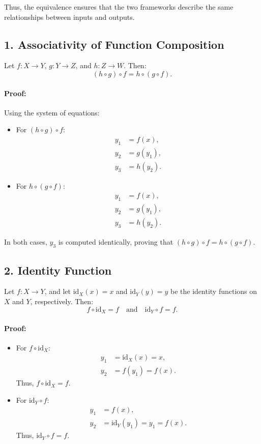 \documentclass{article}
\begin{document}
Thus, the equivalence ensures that the two frameworks describe the same relationships between inputs and outputs.

\subsection*{1. Associativity of Function Composition}
Let \( f: X \to Y \), \( g: Y \to Z \), and \( h: Z \to W \). Then:
\[
(h \circ g) \circ f = h \circ (g \circ f).
\]

\paragraph{Proof:} Using the system of equations:
\begin{itemize}
    \item For \( (h \circ g) \circ f \):
    \[
    \begin{aligned}
    y_1 &= f(x), \\
    y_2 &= g(y_1), \\
    y_3 &= h(y_2).
    \end{aligned}
    \]
    \item For \( h \circ (g \circ f) \):
    \[
    \begin{aligned}
    y_1 &= f(x), \\
    y_2 &= g(y_1), \\
    y_3 &= h(y_2).
    \end{aligned}
    \]
\end{itemize}
In both cases, \( y_3 \) is computed identically, proving that \( (h \circ g) \circ f = h \circ (g \circ f) \).

\subsection*{2. Identity Function}
Let \( f: X \to Y \), and let \( \text{id}_X(x) = x \) and \( \text{id}_Y(y) = y \) be the identity functions on \( X \) and \( Y \), respectively. Then:
\[
f \circ \text{id}_X = f \quad \text{and} \quad \text{id}_Y \circ f = f.
\]

\paragraph{Proof:}
\begin{itemize}
    \item For \( f \circ \text{id}_X \):
    \[
    \begin{aligned}
    y_1 &= \text{id}_X(x) = x, \\
    y_2 &= f(y_1) = f(x).
    \end{aligned}
    \]
    Thus, \( f \circ \text{id}_X = f \).
    \item For \( \text{id}_Y \circ f \):
    \[
    \begin{aligned}
    y_1 &= f(x), \\
    y_2 &= \text{id}_Y(y_1) = y_1 = f(x).
    \end{aligned}
    \]
    Thus, \( \text{id}_Y \circ f = f \).
\end{itemize}
\end{document}
